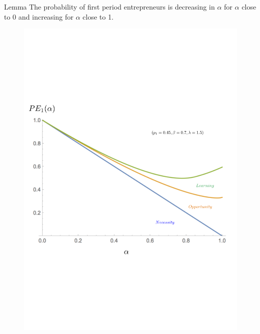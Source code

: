 \documentclass[slides,english,compress]{beamer}
\begin{document}
\begin{frame}
	\frametitle{}

\begin{block}{Lemma}
The probability of first period entrepreneurs is decreasing in $\alpha$ for $\alpha$ close to 0 and increasing for $\alpha$ close to 1.
\end{block}

\pause
\vspace{-3.5cm}
\begin{figure}[h!]
	\includegraphics[scale=0.5]{proba-entrepreneur-labels}
\end{figure}

\end{frame}
\end{document}
